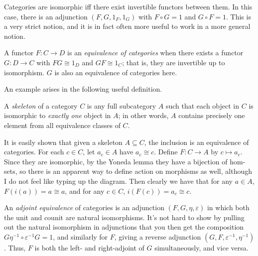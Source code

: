 Categories are isomorphic iff there exist invertible functors between them. In this case, there is an adjunction $(F,G,1_F,1_G)$ with $F\circ G=1$ and $G\circ F=1$. This is a very strict notion, and it is in fact often more useful to work in a more general notion.

\begin{definition}\label{dfn:4.3}
	A functor $F : C \to D$ is an \emph{equivalence of categories} when there exists a functor $G : D \to C$ with $FG\cong 1_D$ and $GF\cong 1_C$; that is, they are invertible up to isomorphism. $G$ is also an equivalence of categories here.
\end{definition}

An example arises in the following useful definition.

\begin{definition}[Skeleton]\label{dfn:4.4}
	A \emph{skeleton} of a category $C$ is any full subcategory $A$ such that each object in $C$ is isomorphic to \emph{exactly one} object in $A$; in other words, $A$ contains precisely one element from all equivalence classes of $C$.
\end{definition}

It is easily shown that given a skeleton $A\subseteq C$, the inclusion is an equivalence of categories. For each $c\in C$, let $a_c\in A$ have $a_c\cong c$. Define $F : C \to A$ by $c\mapsto a_c$. Since they are isomorphic, by the Yoneda lemma they have a bijection of hom-sets, so there is an apparent way to define action on morphisms as well, although I do not feel like typing up the diagram. Then clearly we have that for any $a\in A$, $F(i(a))=a\cong a$, and for any $c\in C$, $i(F(c))=a_c\cong c$.

An \emph{adjoint equivalence} of categories is an adjunction $(F,G,\eta ,\varepsilon )$ in which both the unit and counit are natural isomorphisms. It's not hard to show by pulling out the natural isomorphism in adjunctions that you then get the composition $G\eta ^{-1} \circ \varepsilon ^{-1} G=1$, and similarly for $F$, giving a reverse adjunction $(G,F,\varepsilon ^{-1} ,\eta ^{-1} )$. Thus, $F$ is both the left- and right-adjoint of $G$ simultaneously, and vice versa.

